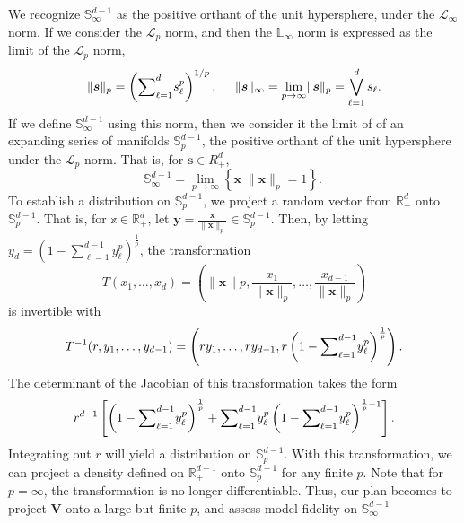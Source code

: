 \documentclass[20pt, a0paper, landscape,colspace=0.8cm,blockverticalspace=0.8cm,innermargin=0.8cm]{tikzposter}
\begin{document}
\begin{columns}
{        We recognize $\mathbb{S}_{\infty}^{d-1}$ as the positive orthant of the unit 
        hypersphere, under the $\mathcal{L}_{\infty}$ norm.  If we consider the 
        $\mathcal{L}_p$ norm, and then the $\mathbb{L}_{\infty}$ norm is expressed as the 
        limit of the $\mathcal{L}_p$ norm,
        \[
            \lVert \bm{s}\rVert_p = \left({\small\sum}_{\ell = 1}^d
                s_{\ell}^p\right)^{1/p},\;\;\;\;\;
            \lVert \bm{s}\rVert_{\infty} = 
            \lim\limits_{p\to\infty}\lVert \bm{s}\rVert_p = \bigvee_{\ell = 1}^d s_{\ell}.
        \]
        If we define $\mathbb{S}_{\infty}^{d-1}$ using this norm, then we consider it the 
        limit of of an expanding series of manifolds $\mathbb{S}_p^{d-1}$, the positive 
        orthant of the unit hypersphere under the $\mathcal{L}_p$ norm.  That is, for 
        $\bm{s}\in R_+^d$,
        \[ 
            \mathbb{S}_{\infty}^{d-1} = 
            \lim\limits_{p\to\infty}\left\lbrace \bm{x}\;\lVert \bm{x}\rVert_p =
            1\right\rbrace.\
        \]
        To establish a distribution on $\mathbb{S}_p^{d-1}$, we project a random vector from 
        $\mathbb{R}_+^d$ onto $\mathbb{S}_p^{d-1}$.  That is, for 
        $\mathbb{x}\in\mathbb{R}_+^d$, let 
        $\bm{y} = \frac{\bm{x}}{\lVert\bm{x}\rVert_p} \in \mathbb{S}_p^{d-1}$.  Then, by letting 
        $y_d = \left(1 - \sum_{\ell = 1}^{d-1}y_{\ell}^p\right)^{\frac{1}{p}}$, the
        transformation
        \[T(x_1,\ldots,x_d) = \left(\lVert \bm{x}\rVert p, \frac{x_1}{\lVert \bm{x}\rVert_p}, 
                \ldots, \frac{x_{d-1}}{\lVert \bm{x}\rVert_p}\right)\]
        is invertible with
        \[T^{-1}(r,y_1,\ldots,y_{d-1}) = 
            \left(ry_1,\ldots,ry_{d-1},r\left(1 - {\small\sum}_{\ell =
                1}^{d-1}y_{\ell}^p\right)^{\frac{1}{p}}\right).\]
        The determinant of the Jacobian of this transformation takes the form
        \[r^{d-1}\left[\left(1 - {\small\sum}_{\ell = 1}^{d-1}y_{\ell}^p\right)^{\frac{1}{p}} +
            {\small\sum}_{\ell = 1}^{d-1}y_{\ell}^p\left(1 - {\small\sum}_{\ell =
            1}^{d-1}y_{\ell}^p\right)^{\frac{1}{p} - 1}\right].\]
        Integrating out $r$ will yield a distribution on $\mathbb{S}_p^{d-1}$.
        With this transformation, we can project a density defined on $\mathbb{R}_+^{d-1}$ 
        onto $\mathbb{S}_{p}^{d-1}$ for any finite $p$.  Note that for $p=\infty$, the
        transformation is no longer differentiable.  Thus, our plan becomes to project 
        $\bm{V}$ onto a large but finite $p$, and assess model fidelity on $\mathbb{S}_{\infty}^{d-1}$
        }
        

\end{columns}
\end{document}
